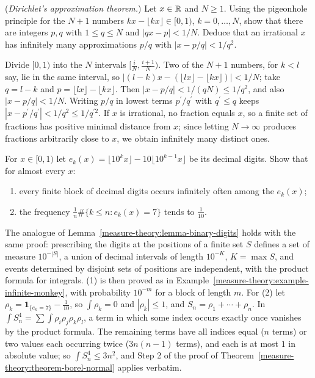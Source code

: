 \begin{exercise}\label{measure-theory:exercise-dirichlet-approximation}
(\emph{Dirichlet's approximation theorem.}) Let $x \in \mathbb{R}$ and $N \geq 1$. Using the pigeonhole principle for the $N + 1$ numbers $kx - \lfloor kx\rfloor \in [0, 1)$, $k = 0, \ldots, N$, show that there
are integers $p, q$ with $1 \leq q \leq N$ and $|qx - p| < 1/N$. Deduce that an irrational $x$ has infinitely many approximations $p/q$ with $|x - p/q| < 1/q^2$.
\end{exercise}

\begin{solution}
Divide $[0, 1)$ into the $N$ intervals $[\frac{i}{N}, \frac{i+1}{N})$. Two of the $N + 1$ numbers, for $k < l$ say, lie in the same interval, so $|(l - k)x - (\lfloor lx\rfloor - \lfloor kx\rfloor)| < 1/N$; take
$q = l - k$ and $p = \lfloor lx\rfloor - \lfloor kx\rfloor$. Then $|x - p/q| < 1/(qN) \leq 1/q^2$, and also $|x - p/q| < 1/N$. Writing $p/q$ in lowest terms $p^{\prime}/q^{\prime}$ with $q^{\prime} \leq q$ keeps
$|x - p^{\prime}/q^{\prime}| < 1/q^2 \leq 1/q^{\prime 2}$. If $x$ is irrational, no fraction equals $x$, so a finite set of fractions has positive minimal distance from $x$; since letting $N \to \infty$ produces
fractions arbitrarily close to $x$, we obtain infinitely many distinct ones.
\end{solution}

\begin{exercise}\label{measure-theory:exercise-decimal-blocks}
For $x \in [0, 1)$ let $e_k(x) = \lfloor 10^kx\rfloor - 10\lfloor 10^{k-1}x\rfloor$ be its decimal digits. Show that for almost every $x$:
\begin{enumerate}
\item every finite block of decimal digits occurs infinitely often among the $e_k(x)$;
\item the frequency $\frac1n\#\{k \leq n : e_k(x) = 7\}$ tends to $\frac1{10}$.
\end{enumerate}
\end{exercise}

\begin{solution}
The analogue of Lemma~\ref{measure-theory:lemma-binary-digits} holds with the same proof: prescribing the digits at the positions of a finite set $S$ defines a set of measure $10^{-|S|}$, a union of
decimal intervals of length $10^{-K}$, $K = \max S$, and events determined by disjoint sets of positions are independent, with the product formula for integrals. (1) is then proved as in
Example~\ref{measure-theory:example-infinite-monkey}, with probability $10^{-m}$ for a block of length $m$. For (2) let $\rho_k = \mathbf{1}_{\{e_k = 7\}} - \frac1{10}$, so $\int\rho_k = 0$ and $|\rho_k| \leq 1$, and
$S_n = \rho_1 + \cdots + \rho_n$. In $\int S_n^4 = \sum\int\rho_i\rho_j\rho_k\rho_l$, a term in which some index occurs exactly once vanishes by the product formula. The remaining terms have all indices equal
($n$ terms) or two values each occurring twice ($3n(n - 1)$ terms), and each is at most $1$ in absolute value; so $\int S_n^4 \leq 3n^2$, and Step 2 of the proof of
Theorem~\ref{measure-theory:theorem-borel-normal} applies verbatim.
\end{solution}

